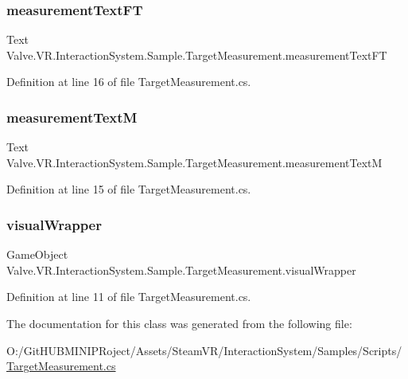 \subsubsection{\texorpdfstring{measurementTextFT}{measurementTextFT}}
{\footnotesize\ttfamily Text Valve.\+V\+R.\+Interaction\+System.\+Sample.\+Target\+Measurement.\+measurement\+Text\+FT}



Definition at line 16 of file Target\+Measurement.\+cs.

\mbox{\label{class_valve_1_1_v_r_1_1_interaction_system_1_1_sample_1_1_target_measurement_a63412fa65bd78474588e0db0deb42423}} 
\subsubsection{\texorpdfstring{measurementTextM}{measurementTextM}}
{\footnotesize\ttfamily Text Valve.\+V\+R.\+Interaction\+System.\+Sample.\+Target\+Measurement.\+measurement\+TextM}



Definition at line 15 of file Target\+Measurement.\+cs.

\mbox{\label{class_valve_1_1_v_r_1_1_interaction_system_1_1_sample_1_1_target_measurement_acdec826d59fe870a5cc1dcf4ea41a598}} 
\subsubsection{\texorpdfstring{visualWrapper}{visualWrapper}}
{\footnotesize\ttfamily Game\+Object Valve.\+V\+R.\+Interaction\+System.\+Sample.\+Target\+Measurement.\+visual\+Wrapper}



Definition at line 11 of file Target\+Measurement.\+cs.



The documentation for this class was generated from the following file\+:\begin{DoxyCompactItemize}
\item 
O\+:/\+Git\+H\+U\+B\+M\+I\+N\+I\+P\+Roject/\+Assets/\+Steam\+V\+R/\+Interaction\+System/\+Samples/\+Scripts/\mbox{\hyperlink{_target_measurement_8cs}{Target\+Measurement.\+cs}}\end{DoxyCompactItemize}
